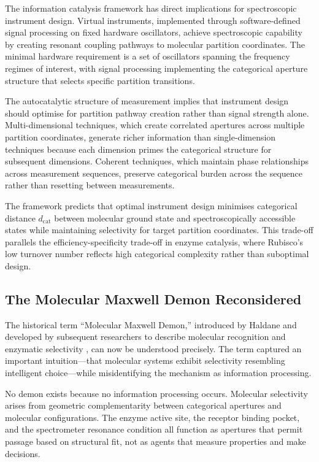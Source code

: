 \documentclass[12pt,a4paper]{article}
\theoremstyle{definition}
\theoremstyle{remark}
\newcommand{\dcat}{d_{\mathrm{cat}}}
\begin{document}
The information catalysis framework has direct implications for spectroscopic instrument design. Virtual instruments, implemented through software-defined signal processing on fixed hardware oscillators, achieve spectroscopic capability by creating resonant coupling pathways to molecular partition coordinates. The minimal hardware requirement is a set of oscillators spanning the frequency regimes of interest, with signal processing implementing the categorical aperture structure that selects specific partition transitions.

The autocatalytic structure of measurement implies that instrument design should optimise for partition pathway creation rather than signal strength alone. Multi-dimensional techniques, which create correlated apertures across multiple partition coordinates, generate richer information than single-dimension techniques because each dimension primes the categorical structure for subsequent dimensions. Coherent techniques, which maintain phase relationships across measurement sequences, preserve categorical burden across the sequence rather than resetting between measurements.

The framework predicts that optimal instrument design minimises categorical distance $\dcat$ between molecular ground state and spectroscopically accessible states while maintaining selectivity for target partition coordinates. This trade-off parallels the efficiency-specificity trade-off in enzyme catalysis, where Rubisco's low turnover number reflects high categorical complexity rather than suboptimal design.

\subsection{The Molecular Maxwell Demon Reconsidered}

The historical term ``Molecular Maxwell Demon,'' introduced by Haldane and developed by subsequent researchers to describe molecular recognition and enzymatic selectivity \citep{haldane1930}, can now be understood precisely. The term captured an important intuition---that molecular systems exhibit selectivity resembling intelligent choice---while misidentifying the mechanism as information processing.

No demon exists because no information processing occurs. Molecular selectivity arises from geometric complementarity between categorical apertures and molecular configurations. The enzyme active site, the receptor binding pocket, and the spectrometer resonance condition all function as apertures that permit passage based on structural fit, not as agents that measure properties and make decisions.
\end{document}
